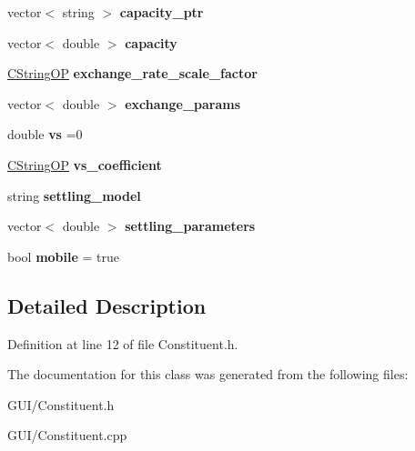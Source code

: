 \begin{DoxyCompactItemize}
\item 
\mbox{\label{class_c_constituent_a23ec98d8b24a175740225874541dd4c6}} 
vector$<$ string $>$ {\bfseries capacity\+\_\+ptr}
\item 
\mbox{\label{class_c_constituent_a9d97826e96e881b851b30d1e4db465b2}} 
vector$<$ double $>$ {\bfseries capacity}
\item 
\mbox{\label{class_c_constituent_a5946df5de81e849a79f3863f2335eda2}} 
\hyperlink{class_c_string_o_p}{C\+String\+OP} {\bfseries exchange\+\_\+rate\+\_\+scale\+\_\+factor}
\item 
\mbox{\label{class_c_constituent_a301ef383ef97aa1790694207328b342b}} 
vector$<$ double $>$ {\bfseries exchange\+\_\+params}
\item 
\mbox{\label{class_c_constituent_a9c9347c7309c676837e44750cc3f9869}} 
double {\bfseries vs} =0
\item 
\mbox{\label{class_c_constituent_ae157ff6a17a96ec2a312ba67d92e6586}} 
\hyperlink{class_c_string_o_p}{C\+String\+OP} {\bfseries vs\+\_\+coefficient}
\item 
\mbox{\label{class_c_constituent_a21ca0956c070a01e5661182da55641c2}} 
string {\bfseries settling\+\_\+model}
\item 
\mbox{\label{class_c_constituent_aad33d13c45b6b94da0cdb43fd98705ad}} 
vector$<$ double $>$ {\bfseries settling\+\_\+parameters}
\item 
\mbox{\label{class_c_constituent_acfb2272cbcf00d70b300249554474138}} 
bool {\bfseries mobile} = true
\end{DoxyCompactItemize}


\subsection{Detailed Description}


Definition at line 12 of file Constituent.\+h.



The documentation for this class was generated from the following files\+:\begin{DoxyCompactItemize}
\item 
G\+U\+I/Constituent.\+h\item 
G\+U\+I/Constituent.\+cpp\end{DoxyCompactItemize}
